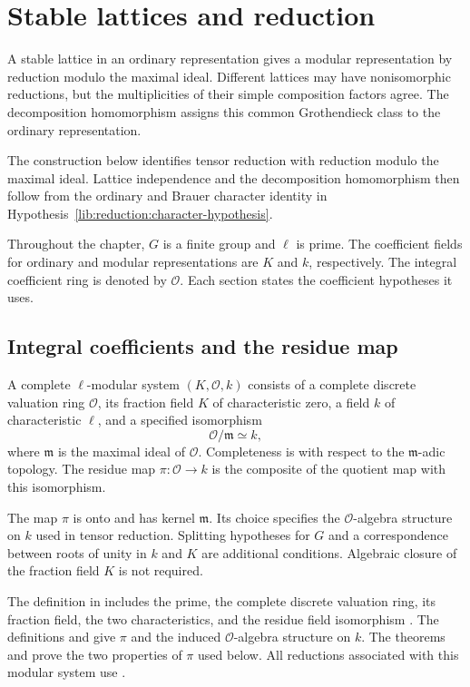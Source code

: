 \chapter{Stable lattices and reduction}
\label{chap:library:reduction}

A stable lattice in an ordinary representation gives a modular
representation by reduction modulo the maximal ideal. Different lattices
may have nonisomorphic reductions, but the multiplicities of their simple
composition factors agree. The decomposition homomorphism assigns this
common Grothendieck class to the ordinary representation.

The construction below identifies tensor reduction with reduction modulo
the maximal ideal. Lattice independence and the decomposition homomorphism
then follow from the ordinary and Brauer character identity in
Hypothesis~\ref{lib:reduction:character-hypothesis}.

Throughout the chapter, $G$ is a finite group and $\ell$ is prime.
The coefficient fields for ordinary and modular representations are
$K$ and $k$, respectively. The integral coefficient ring is denoted by
$\mathcal O$. Each section states the coefficient hypotheses it uses.

\section{Integral coefficients and the residue map}
\label{lib:reduction:modular-system}

\begin{definition}
A complete $\ell$-modular system $(K,\mathcal O,k)$ consists of a complete
discrete valuation ring $\mathcal O$, its fraction field $K$ of
characteristic zero, a field $k$ of characteristic $\ell$, and a specified
isomorphism
\[
 \mathcal O/\mathfrak m\simeq k,
\]
where $\mathfrak m$ is the maximal ideal of $\mathcal O$. Completeness is
with respect to the $\mathfrak m$-adic topology. The residue map
$\pi:\mathcal O\to k$ is the composite of the quotient map with this
isomorphism.
\end{definition}

The map $\pi$ is onto and has kernel $\mathfrak m$. Its choice specifies
the $\mathcal O$-algebra structure on $k$ used in tensor reduction.
Splitting hypotheses for $G$ and a correspondence between roots of unity
in $k$ and $K$ are additional conditions. Algebraic closure of the
fraction field $K$ is not required.

\begin{implementation}
The definition in  includes the prime,
the complete discrete valuation ring, its fraction field, the two
characteristics, and the residue field isomorphism .
The definitions  and
 give $\pi$ and the induced
$\mathcal O$-algebra structure on $k$.
The theorems  and  prove the
two properties of $\pi$ used below. All reductions associated with this
modular system use .
\end{implementation}

